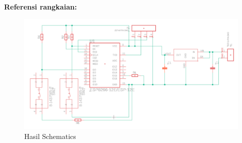 \textbf{Referensi rangkaian:} 
\begin{figure}[H]
    \centering
    \includegraphics[width=1.1\linewidth]{P1/img/hasiljadischematic.png}
    \caption{Hasil Schematics} 
    \label{fig:hasilschematics}
\end{figure}

